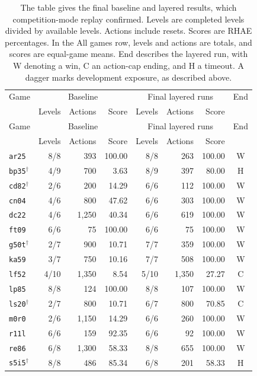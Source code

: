\begin{longtable}{@{}lrrr rrr c@{}}
\caption{The table gives the final baseline and layered results, which competition-mode replay confirmed. Levels are completed levels divided by available levels. Actions include resets. Scores are RHAE percentages. In the All games row, levels and actions are totals, and scores are equal-game means. End describes the layered run, with W denoting a win, C an action-cap ending, and H a timeout. A dagger marks development exposure, as described above.}\label{tab:layered-games}\\
\toprule
Game & \multicolumn{3}{c}{Baseline} & \multicolumn{3}{c}{Final layered runs} & End\\
 & Levels & Actions & Score & Levels & Actions & Score & \\\midrule
\endfirsthead
\toprule Game & \multicolumn{3}{c}{Baseline} & \multicolumn{3}{c}{Final layered runs} & End\\
 & Levels & Actions & Score & Levels & Actions & Score & \\\midrule
\endhead
\texttt{ar25} & 8/8 & 393 & 100.00 & 8/8 & 263 & 100.00 & W\\
\texttt{bp35}$^{\dagger}$ & 4/9 & 700 & 3.63 & 8/9 & 397 & 80.00 & H\\
\texttt{cd82}$^{\dagger}$ & 2/6 & 200 & 14.29 & 6/6 & 112 & 100.00 & W\\
\texttt{cn04} & 4/6 & 800 & 47.62 & 6/6 & 303 & 100.00 & W\\
\texttt{dc22} & 4/6 & 1,250 & 40.34 & 6/6 & 619 & 100.00 & W\\
\texttt{ft09} & 6/6 & 75 & 100.00 & 6/6 & 75 & 100.00 & W\\
\texttt{g50t}$^{\dagger}$ & 2/7 & 900 & 10.71 & 7/7 & 359 & 100.00 & W\\
\texttt{ka59} & 3/7 & 750 & 10.16 & 7/7 & 508 & 100.00 & W\\
\texttt{lf52} & 4/10 & 1,350 & 8.54 & 5/10 & 1,350 & 27.27 & C\\
\texttt{lp85} & 8/8 & 124 & 100.00 & 8/8 & 107 & 100.00 & W\\
\texttt{ls20}$^{\dagger}$ & 2/7 & 800 & 10.71 & 6/7 & 800 & 70.85 & C\\
\texttt{m0r0} & 2/6 & 1,150 & 14.29 & 6/6 & 260 & 100.00 & W\\
\texttt{r11l} & 6/6 & 159 & 92.35 & 6/6 & 92 & 100.00 & W\\
\texttt{re86} & 6/8 & 1,300 & 58.33 & 8/8 & 655 & 100.00 & W\\
\texttt{s5i5}$^{\dagger}$ & 8/8 & 486 & 85.34 & 6/8 & 201 & 58.33 & H\\

\end{longtable}
